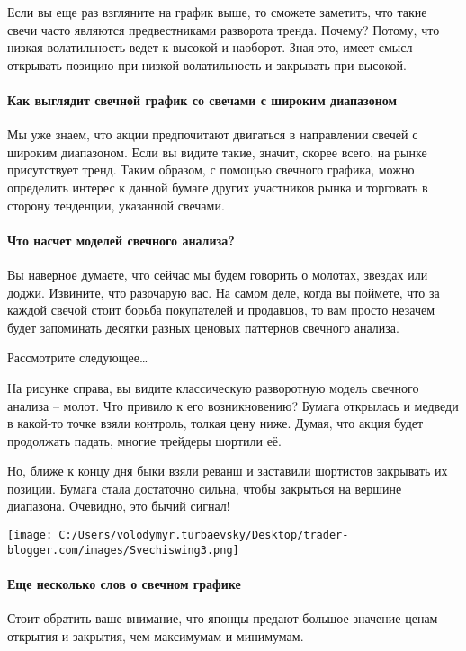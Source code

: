 \documentclass[a5paper]{article}
\begin{document}
Если вы еще раз взгляните на график выше, то сможете заметить, что
такие свечи часто являются предвестниками разворота тренда. Почему?
Потому, что низкая волатильность ведет к высокой и наоборот. Зная это,
имеет смысл открывать позицию при низкой волатильность и закрывать при
высокой.

\paragraph{Как выглядит свечной график со свечами с широким
  диапазоном}

Мы уже знаем, что акции предпочитают двигаться в направлении свечей с
широким диапазоном. Если вы видите такие, значит, скорее всего, на
рынке присутствует тренд. Таким образом, с помощью свечного графика,
можно определить интерес к данной бумаге других участников рынка и
торговать в сторону тенденции, указанной свечами.

\paragraph{Что насчет моделей свечного анализа?}

Вы наверное думаете, что сейчас мы будем говорить о молотах, звездах или доджи. Извините, что разочарую вас. На самом деле, когда вы поймете, что за каждой свечой стоит борьба покупателей и продавцов, то вам просто незачем будет запоминать десятки разных ценовых паттернов свечного анализа.

Рассмотрите следующее…

На рисунке справа, вы видите классическую разворотную модель свечного анализа – молот. Что привило к его возникновению? Бумага открылась и медведи в какой-то точке взяли контроль, толкая цену ниже. Думая, что акция будет продолжать падать, многие трейдеры шортили её.

Но, ближе к концу дня быки взяли реванш и заставили шортистов
закрывать их позиции. Бумага стала достаточно сильна, чтобы закрыться
на вершине диапазона. Очевидно, это бычий сигнал!

\texttt{[image: C:/Users/volodymyr.turbaevsky/Desktop/trader-blogger.com/images/Svechiswing3.png]}

\paragraph{Еще несколько слов о свечном графике}

Стоит обратить ваше внимание, что японцы предают большое значение ценам открытия и закрытия, чем максимумам и минимумам.
\end{document}
